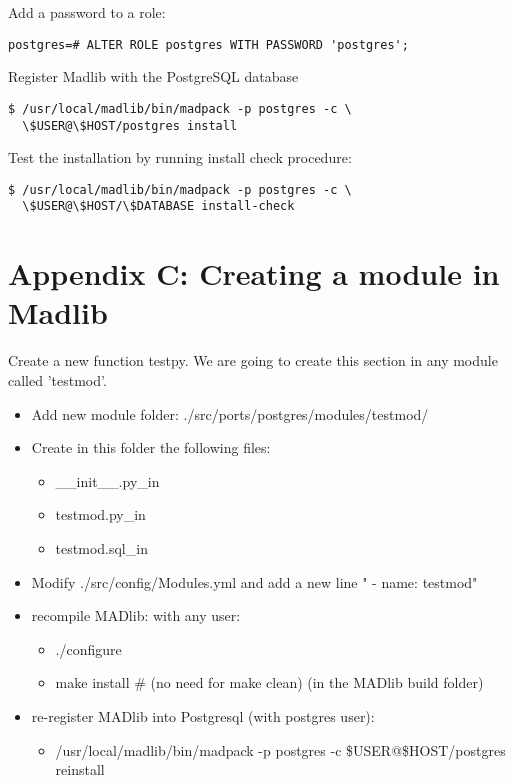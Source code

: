 {\raggedleft Add a password to a role:}
\begin{verbatim}
postgres=# ALTER ROLE postgres WITH PASSWORD 'postgres';
\end{verbatim}

{\raggedleft Register Madlib with the PostgreSQL database}
\begin{verbatim}
$ /usr/local/madlib/bin/madpack -p postgres -c \ 
  \$USER@\$HOST/postgres install
\end{verbatim}

{\raggedleft Test the installation by running install check procedure:}
\begin{verbatim}
$ /usr/local/madlib/bin/madpack -p postgres -c \
  \$USER@\$HOST/\$DATABASE install-check
\end{verbatim}

\section*{Appendix C: Creating a module in Madlib}

Create a new function testpy. We are going to create this section in any module called 'testmod'.

\begin{itemize}
  \item Add new module folder: ./src/ports/postgres/modules/testmod/
  \item Create in this folder the following files:

\begin{itemize}
  \item \_\_init\_\_.py\_in  
  \item testmod.py\_in
  \item testmod.sql\_in
\end{itemize}

\item Modify ./src/config/Modules.yml and add a new line "	- name: testmod"
  \item recompile MADlib: with any user:

\begin{itemize}
  \item ./configure
  \item make install      \# (no need for make clean) (in the MADlib build folder)
\end{itemize}
  \item re-register MADlib into Postgresql (with postgres user):
  \begin{itemize}
  \item  /usr/local/madlib/bin/madpack -p postgres -c \$USER@\$HOST/postgres reinstall
  \end{itemize}
 \end{itemize}
 


